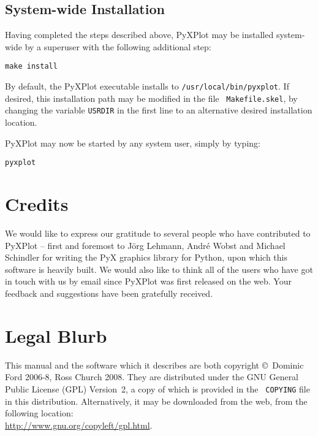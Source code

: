 \subsection{System-wide Installation}

Having completed the steps described above, PyXPlot may be installed
system-wide by a superuser with the following additional
step:

\begin{verbatim}
make install
\end{verbatim}

By default, the PyXPlot executable installs to {\tt /usr/local/bin/pyxplot}.
If desired, this installation path may be modified in the file {\tt
Makefile.skel}, by changing the variable {\tt USRDIR} in the first line to an
alternative desired installation location.

PyXPlot may now be started by any system user, simply by typing:

\begin{verbatim}
pyxplot
\end{verbatim}

\section{Credits}

We would like to express our gratitude to several people who have contributed
to PyXPlot -- first and foremost to J\"org Lehmann,
Andr\'e Wobst and Michael Schindler for writing the PyX graphics library for Python, upon which
this software is heavily built. We would also like to think all of the users
who have got in touch with us by email since PyXPlot was first released on the
web.  Your feedback and suggestions have been gratefully received.

\section{Legal Blurb}

This manual and the software which it describes are both copyright \copyright\
Dominic Ford 2006-8, Ross Church 2008. They are distributed under the GNU
General Public License (GPL) Version~2, a copy of which is provided in the {\tt
COPYING} file in this distribution. Alternatively, it may be downloaded from the web, from
the following location:\\ \url{http://www.gnu.org/copyleft/gpl.html}.

